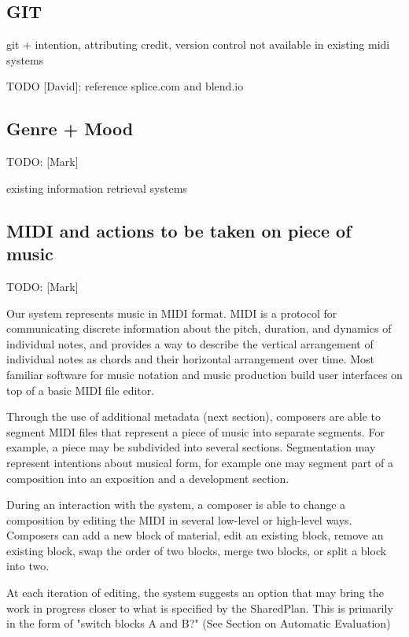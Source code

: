 \documentclass[final,authoryear,11pt,times]{elsarticle}
\begin{document}
\subsection{GIT}

git + intention, attributing credit, version control not available in existing midi systems

TODO [David]: reference splice.com and blend.io



\subsection{Genre + Mood}

TODO: [Mark]

existing information retrieval systems


\subsection{MIDI and actions to be taken on piece of music}
TODO: [Mark]

Our system represents music in MIDI format. MIDI is a protocol for communicating discrete information about the pitch, duration, and dynamics of individual notes, and provides a way to describe the vertical arrangement of individual notes as chords and their horizontal arrangement over time. Most familiar software for music notation and music production build user interfaces on top of a basic MIDI file editor.

Through the use of additional metadata (next section), composers are able to segment MIDI files that represent a piece of music into separate segments. For example, a piece may be subdivided into several sections. Segmentation may represent intentions about musical form, for example one may segment part of a composition into an exposition and a development section.

During an interaction with the system, a composer is able to change a composition by editing the MIDI in several low-level or high-level ways. Composers can add a new block of material, edit an existing block, remove an existing block, swap the order of two blocks, merge two blocks, or split a block into two.

At each iteration of editing, the system suggests an option that may bring the work in progress closer to what is specified by the SharedPlan. This is primarily in the form of "switch blocks A and B?" (See Section on Automatic Evaluation)
\end{document}
